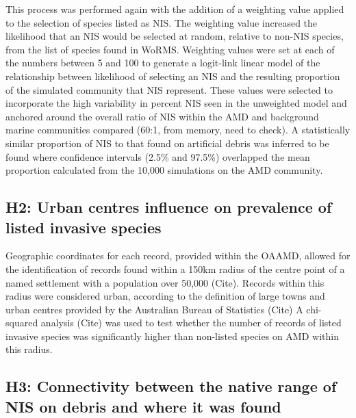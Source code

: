 \documentclass[a4paper, nobind]{templates/ociamthesis}
\begin{document}
This process was performed again with the addition of a weighting value applied to the selection of species listed as NIS. The weighting value increased the likelihood that an NIS would be selected at random, relative to non-NIS species, from the list of species found in WoRMS. Weighting values were set at each of the numbers between 5 and 100 to generate a logit-link linear model of the relationship between likelihood of selecting an NIS and the resulting proportion of the simulated community that NIS represent. These values were selected to incorporate the high variability in percent NIS seen in the unweighted model and anchored around the overall ratio of NIS within the AMD and background marine communities compared (60:1, from memory, need to check). A statistically similar proportion of NIS to that found on artificial debris was inferred to be found where confidence intervals (2.5\% and 97.5\%) overlapped the mean proportion calculated from the 10,000 simulations on the AMD community.

\hypertarget{h2-urban-centres-influence-on-prevalence-of-listed-invasive-species}{%
\subsection{H2: Urban centres influence on prevalence of listed invasive species}\label{h2-urban-centres-influence-on-prevalence-of-listed-invasive-species}}

Geographic coordinates for each record, provided within the OAAMD, allowed for the identification of records found within a 150km radius of the centre point of a named settlement with a population over 50,000 (Cite). Records within this radius were considered urban, according to the definition of large towns and urban centres provided by the Australian Bureau of Statistics (Cite) A chi-squared analysis (Cite) was used to test whether the number of records of listed invasive species was significantly higher than non-listed species on AMD within this radius.

\hypertarget{h3-connectivity-between-the-native-range-of-nis-on-debris-and-where-it-was-found}{%
\subsection{H3: Connectivity between the native range of NIS on debris and where it was found}\label{h3-connectivity-between-the-native-range-of-nis-on-debris-and-where-it-was-found}}
\end{document}
